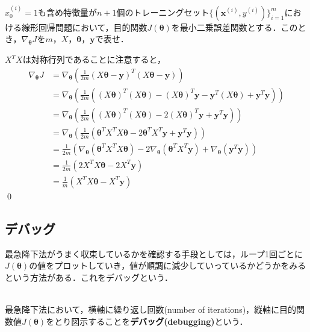 \begin{qu}
$x_0^{(i)}=1$も含め特徴量が$n+1$個のトレーニングセット$\{({\bm x}^{(i)},y^{(i)})\}_{i=1}^m$における線形回帰問題において，目的関数$J({\bm \theta})$を最小二乗誤差関数とする．このとき，$\nabla_{{\bm \theta}}J$を$m$，$X$，${\bm \theta}$，${\bm y}$で表せ．
\end{qu}
\begin{ans}
$X^TX$は対称行列であることに注意すると，
\begin{align}
\nabla_{{\bm \theta}}J&=\nabla_{{\bm \theta}}\left(\frac{1}{2m}(X{\bm \theta}-{\bm y})^T(X{\bm \theta}-{\bm y})\right) \nonumber\\
&=\nabla_{{\bm \theta}}\left(\frac{1}{2m}\left((X{\bm \theta})^T(X{\bm \theta})-(X{\bm \theta})^T{\bm y}-{\bm y}^T(X{\bm \theta})+{\bm y}^T{\bm y}\right)\right)\nonumber\\
&=\nabla_{{\bm \theta}}\left(\frac{1}{2m}\left((X{\bm \theta})^T(X{\bm \theta})-2(X{\bm \theta})^T{\bm y}+{\bm y}^T{\bm y}\right)\right)\nonumber\\
&=\nabla_{{\bm \theta}}\left(\frac{1}{2m}\left( {\bm \theta}^TX^TX{\bm \theta}-2{\bm \theta}^TX^T{\bm y}+{\bm y}^T{\bm y} \right)\right) \nonumber\\
&=\frac{1}{2m}\left(\nabla_{{\bm \theta}}({\bm \theta}^TX^TX{\bm \theta})-2\nabla_{{\bm \theta}}({\bm \theta}^TX^T{\bm y})+\nabla_{{\bm \theta}}({\bm y}^T{\bm y})\right)\nonumber\\
&=\frac{1}{2m}\left(2X^TX{\bm \theta}-2X^T{\bm y}\right)\nonumber \\
&=\frac{1}{m}\left(X^TX{\bm \theta}-X^T{\bm y}\right) \label{LRglad}
\end{align}\qed
\end{ans}

\subsection{デバッグ}

最急降下法がうまく収束しているかを確認する手段としては，ループ1回ごとに$J({\bm \theta})$の値をプロットしていき，値が順調に減少していっているかどうかをみるという方法がある．これをデバッグという．

\begin{defi}[デバッグ]
　\\
最急降下法において，横軸に繰り返し回数(number of iterations)，縦軸に目的関数値$J({\bm \theta})$をとり図示することを{\bf デバッグ(debugging)}という．
\end{defi}

